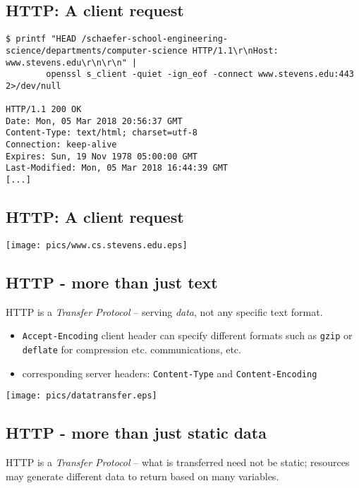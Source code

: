\documentclass[xga]{xdvislides}
\begin{document}
\subsection{HTTP: A client request}
\smallish
\begin{verbatim}
$ printf "HEAD /schaefer-school-engineering-science/departments/computer-science HTTP/1.1\r\nHost: www.stevens.edu\r\n\r\n" |
        openssl s_client -quiet -ign_eof -connect www.stevens.edu:443 2>/dev/null 

HTTP/1.1 200 OK
Date: Mon, 05 Mar 2018 20:56:37 GMT
Content-Type: text/html; charset=utf-8
Connection: keep-alive
Expires: Sun, 19 Nov 1978 05:00:00 GMT
Last-Modified: Mon, 05 Mar 2018 16:44:39 GMT
[...]
\end{verbatim}
\Normalsize

\subsection{HTTP: A client request}
\begin{center}
	\texttt{[image: pics/www.cs.stevens.edu.eps]}
\end{center}


\subsection{HTTP - more than just text}
HTTP is a {\em Transfer Protocol} -- serving {\em data}, not any specific
text format.

\begin{itemize}
	\item {\tt Accept-Encoding} client header can specify different formats
		such as {\tt gzip} or {\tt deflate} for compression etc.
		communications, etc.
	\item corresponding server headers: {\tt Content-Type} and
		{\tt Content-Encoding}
\end{itemize}
\begin{center}
	\texttt{[image: pics/datatransfer.eps]}
\end{center}

\subsection{HTTP - more than just static data}
HTTP is a {\em Transfer Protocol} -- what is transferred need not be
static; resources may generate different data to return based on many
variables.
\end{document}
